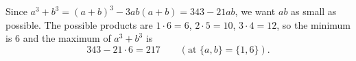 Since $a^3+b^3=(a+b)^3-3ab(a+b)=343-21ab$, we want $ab$ as small as possible. The possible products are $1\cdot6=6$, $2\cdot5=10$, $3\cdot4=12$, so the minimum is $6$ and the maximum of $a^3+b^3$ is
\[343-21\cdot6=\boxed{217}\qquad(\text{at }\{a,b\}=\{1,6\}).\]
